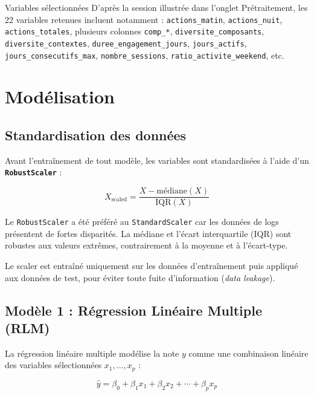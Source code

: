 \documentclass[12pt, a4paper, french]{report}
\begin{document}
\begin{analysebox}{Variables sélectionnées}
D'après la session illustrée dans l'onglet Prétraitement, les 22 variables retenues incluent notamment : \texttt{actions\_matin}, \texttt{actions\_nuit}, \texttt{actions\_totales}, plusieurs colonnes \texttt{comp\_*}, \texttt{diversite\_composants}, \texttt{diversite\_contextes}, \texttt{duree\_engagement\_jours}, \texttt{jours\_actifs}, \texttt{jours\_consecutifs\_max}, \texttt{nombre\_sessions}, \texttt{ratio\_activite\_weekend}, etc.
\end{analysebox}

\chapter{Modélisation}

\section{Standardisation des données}

Avant l'entraînement de tout modèle, les variables sont standardisées à l'aide d'un \textbf{\texttt{RobustScaler}} :

\begin{equation}
  X_{\text{scaled}} = \frac{X - \mathrm{médiane}(X)}{\mathrm{IQR}(X)}
\end{equation}

Le \texttt{RobustScaler} a été préféré au \texttt{StandardScaler} car les données de logs présentent de fortes disparités.
La médiane et l'écart interquartile (IQR) sont robustes aux valeurs extrêmes, contrairement à la moyenne et à l'écart-type.

Le scaler est entraîné uniquement sur les données d'entraînement puis appliqué aux données de test, pour éviter toute fuite d'information (\textit{data leakage}).

\section{Modèle 1 : Régression Linéaire Multiple (RLM)}

La régression linéaire multiple modélise la note $y$ comme une combinaison linéaire des variables sélectionnées $x_1, \ldots, x_p$ :

\begin{equation}
  \hat{y} = \beta_0 + \beta_1 x_1 + \beta_2 x_2 + \cdots + \beta_p x_p
\end{equation}
\end{document}
